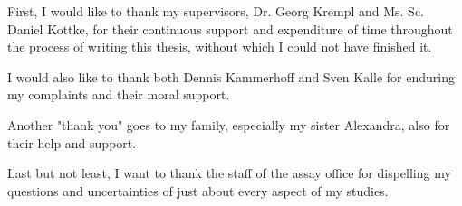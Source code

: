 \label{acknowledgement}

First, I would like to thank my supervisors, Dr. Georg Krempl and Ms. Sc. Daniel Kottke, for their continuous support and expenditure of time throughout the process of writing this thesis, without which I could not have finished it.

I would also like to thank both Dennis Kammerhoff and Sven Kalle for enduring my complaints and their moral support.

Another "thank you" goes to my family, especially my sister Alexandra, also for their help and support.

Last but not least, I want to thank the staff of the assay office for dispelling my questions and uncertainties of just about every aspect of my studies.